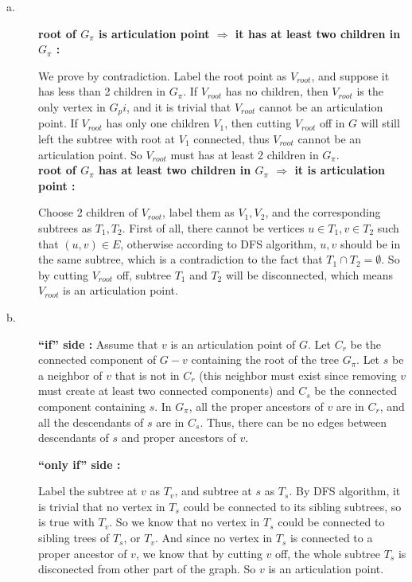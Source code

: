 \begin{description}

\item[a. \hspace{9pt}] 

\textbf{root of $G_\pi$ is articulation point $\Rightarrow$ it has at least two children in $G_\pi$ :}

We prove by contradiction. Label the root point as $V_{root}$, and suppose it has less than 2 children in $G_\pi$. If $V_{root}$ has no children, then $V_{root}$ is the only
vertex in $G_pi$, and it is trivial that $V_{root}$ cannot be an articulation point. If $V_{root}$ has only one children $V_1$, then cutting $V_{root}$ off in  $G$ will still
left the subtree with root at $V_1$ connected, thus $V_{root}$ cannot be an articulation point. So $V_{root}$ must has at least 2 children in $G_\pi$. \\

\textbf{root of $G_\pi$ has at least two children in $G_\pi$ $\Rightarrow$ it is articulation point :}

Choose 2 children of $V_{root}$, label them as $V_1, V_2$, and the corresponding subtrees as $T_1, T_2$. First of all, there cannot be vertices $u\in T_1, v\in T_2$ such that $(u, v)\in E$,
otherwise according to DFS algorithm, $u, v$ should be in the same subtree, which is a contradiction to the fact that  $T_1 \cap T_2=\emptyset$. So by cutting $V_{root}$ off, subtree $T_1$ and $T_2$
will be disconnected, which means $V_{root}$ is an articulation point.

\item[b. \hspace{9pt}]

\textbf{``if'' side :}
Assume that $v$ is an articulation point of $G$. Let $C_r$ be the connected component of $G-v$ containing the root of the tree $G_{\pi}$. Let $s$ be a neighbor of $v$ that is not in $C_r$
(this neighbor must exist since removing $v$ must create at least two connected components) and $C_s$ be the connected component containing $s$. In $G_\pi$, all the proper ancestors of
$v$ are in $C_r$, and all the descendants of $s$ are in $C_s$. Thus, there can be no edges between descendants of $s$ and proper ancestors of $v$.

\textbf{``only if'' side :}

Label the subtree at $v$ as $T_v$, and subtree at $s$ as $T_s$. By DFS algorithm, it is trivial that no vertex in $T_s$ could be connected to its sibling subtrees, so is true with $T_v$.
So we know that no vertex in $T_s$ could be connected to sibling trees of $T_s$, or $T_v$. And since no vertex in $T_s$ is connected to a proper ancestor of $v$, we know that by cutting
$v$ off, the whole subtree $T_s$ is disconected from other part of the graph. So $v$ is an articulation point.


\end{description}
